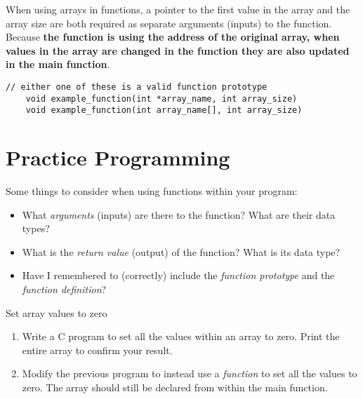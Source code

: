 \documentclass{pass}
\begin{document}
When using arrays in functions, a pointer to the first value in the array and the array size are both required as separate arguments (inputs) to the function. Because \textbf{the function is using the address of the original array, when values in the array are changed in the function they are also updated in the main function}.

\begin{lstlisting}[style=CStyle]
	// either one of these is a valid function prototype
	void example_function(int *array_name, int array_size)	
	void example_function(int array_name[], int array_size)
\end{lstlisting}


\pagebreak

\section*{Practice Programming}
Some things to consider when using functions within your program:
\begin{itemize}
\item What \textit{arguments} (inputs) are there to the function? What are their data types?
\item What is the \textit{return value} (output) of the function? What is its data type?
\item Have I remembered to (correctly) include the \textit{function prototype} and the \textit{function definition}?
\end{itemize}

\begin{task}{Set array values to zero}{}
	\begin{enumerate}
	\item Write a C program to set all the values within an array to zero. Print the entire array to confirm your result.\\[6pt]
	\item Modify the previous program to instead use a \textit{function} to set all the values to zero. The array should still be declared from within the main function.
	\end{enumerate}
\end{task}
\end{document}
